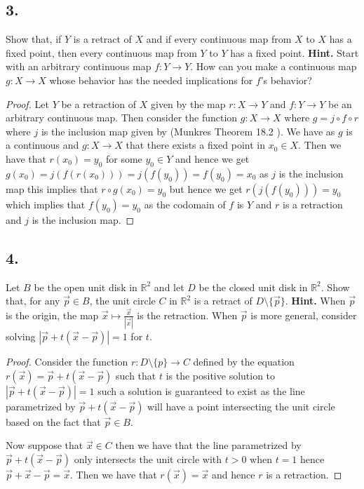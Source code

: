 \documentclass{amsart}
\theoremstyle{plain}
\theoremstyle{definition}
\theoremstyle{remark}
\begin{document}
\vspace{.15in}
\noindent
\subsection*{3.} Show that, if $Y$ is a retract of $X$ and if every continuous map from $X$ to $X$ has a fixed point, then every continuous map from $Y$ to $Y$ has a fixed point. {\bf Hint.} Start with an arbitrary continuous map $f : Y\to Y$. How can you make a continuous map $g : X\to X$ whose behavior has the needed implications for $f$'s behavior?

\begin{proof}
    Let $Y$ be a retraction of $X$ given by the map $r:X\to Y$ and $f:Y\to Y$ be an arbitrary continuous map. Then consider the function $g:X\to X$ where $g=j\circ f\circ r$ where $j$ is the inclusion map given by (Munkres Theorem 18.2 ). We have as $g$ is a continuous and $g:X \to X$ that there exists a fixed point in $x_0 \in X$. Then we have that $r(x_0)=y_0$ for some $y_0\in Y$ and hence we get $g(x_0)=j(f(r(x_0)))=j(f(y_0))=f(y_0)=x_0$ as $j$ is the inclusion map this implies that $r \circ g(x_0)=y_0$ but hence we get $r(j(f(y_0)))=y_0$ which implies that $f(y_0)=y_0$ as the codomain of $f$ is $Y$ and $r$ is a retraction and $j$ is the inclusion map.

    
\end{proof}
 


\vspace{.15in}
\noindent
\subsection*{4.} Let $B$ be the open unit disk in $\mathbb R ^2$ and let $D$ be the closed unit disk in $\mathbb R ^2$. Show that, for any $\vec{p} \in B$, the unit circle $C$ in $\mathbb R ^2$ is a retract of $D\setminus \{ \vec{p}\}$. {\bf Hint.} When $\vec{p}$ is the origin, the map $\vec{x} \mapsto \frac{\vec{x}}{|\vec{x}|}$ is the retraction. When $\vec{p}$ is more general, consider solving $|\vec{p} + t(\vec{x}-\vec{p})| = 1$ for $t$. 

\begin{proof}
    Consider the function $r: D\setminus \{p\}\to C$ defined by the equation $r(\vec{x})=\vec{p}+t(\vec x - \vec p)$ such that $t$ is the positive solution to $|\vec p + t(\vec x - \vec p)|=1$ such a solution is guaranteed to exist as the line parametrized by $\vec p + t(\vec x - \vec p)$ will have a point intersecting the unit circle based on the fact that $\vec p \in B$. 

    Now suppose that $\vec{x}\in C$ then we have that the line parametrized by $\vec{p}+t(\vec x - \vec p)$ only intersects the unit circle with $t>0$ when $t=1$ hence $\vec{p}+\vec x- \vec p= \vec x$. Then we have that $r(\vec x)=\vec x$ and hence $r$ is a retraction.


\end{proof}
\end{document}
